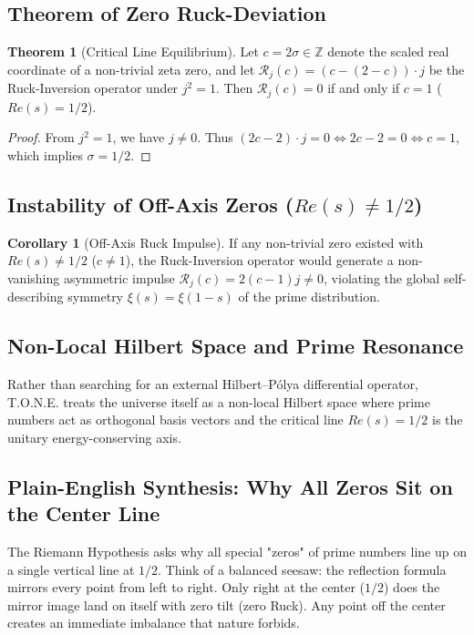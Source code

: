 \documentclass[11pt,a4paper,oneside]{article}
\def\text#1{#1}%
\theoremstyle{definition}
\newtheorem{theorem}{Theorem}[section]
\newtheorem{corollary}{Corollary}[theorem]
\begin{document}
\subsection{Theorem of Zero Ruck-Deviation}
\begin{theorem}[Critical Line Equilibrium]
Let $c = 2\sigma \in \mathbb{Z}$ denote the scaled real coordinate of a non-trivial zeta zero, and let $\mathcal{R}_j(c) = (c - (2 - c)) \cdot j$ be the Ruck-Inversion operator under $j^2 = 1$. Then $\mathcal{R}_j(c) = 0$ if and only if $c = 1$ ($\text{Re}(s) = 1/2$).
\end{theorem}
\begin{proof}
From $j^2 = 1$, we have $j \neq 0$. Thus $(2c - 2) \cdot j = 0 \iff 2c - 2 = 0 \iff c = 1$, which implies $\sigma = 1/2$.
\end{proof}
\subsection{Instability of Off-Axis Zeros ($\text{Re}(s) \neq 1/2$)}
\begin{corollary}[Off-Axis Ruck Impulse]
If any non-trivial zero existed with $\text{Re}(s) \neq 1/2$ ($c \neq 1$), the Ruck-Inversion operator would generate a non-vanishing asymmetric impulse $\mathcal{R}_j(c) = 2(c - 1)j \neq 0$, violating the global self-describing symmetry $\xi(s) = \xi(1-s)$ of the prime distribution.
\end{corollary}
\subsection{Non-Local Hilbert Space and Prime Resonance}
Rather than searching for an external Hilbert–Pólya differential operator, T.O.N.E. treats the universe itself as a non-local Hilbert space where prime numbers act as orthogonal basis vectors and the critical line $\text{Re}(s) = 1/2$ is the unitary energy-conserving axis.
\subsection{Plain-English Synthesis: Why All Zeros Sit on the Center Line}
\begin{noobbox}
The Riemann Hypothesis asks why all special "zeros" of prime numbers line up on a single vertical line at $1/2$. Think of a balanced seesaw: the reflection formula mirrors every point from left to right. Only right at the center ($1/2$) does the mirror image land on itself with zero tilt (zero Ruck). Any point off the center creates an immediate imbalance that nature forbids.
\end{noobbox}
\end{document}
